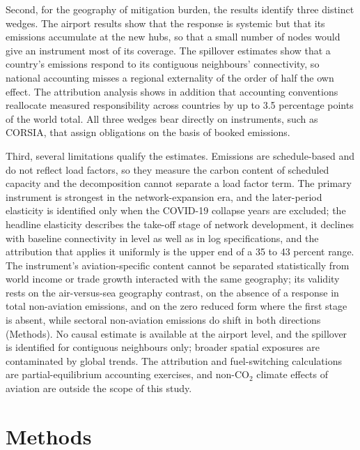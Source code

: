 \documentclass[12pt]{article}
\begin{document}
Second, for the geography of mitigation burden, the results identify three
distinct wedges. The airport results show that the response is systemic
but that its emissions accumulate at the new hubs, so that a small number
of nodes would give an instrument most of its coverage. The spillover
estimates show that a country's emissions respond to its contiguous
neighbours' connectivity, so national accounting misses a regional
externality of the order of half the own effect. The attribution analysis
shows in addition that accounting conventions reallocate measured
responsibility across countries by up to 3.5 percentage points of the
world total. All three wedges bear directly on instruments, such as
CORSIA, that assign obligations on the basis of booked emissions.

Third, several limitations qualify the estimates. Emissions are
schedule-based and do not reflect load factors, so they measure the carbon
content of scheduled capacity and the decomposition cannot separate a load
factor term. The primary instrument is strongest in the network-expansion
era, and the later-period elasticity is identified only when the COVID-19
collapse years are excluded; the headline elasticity describes the
take-off stage of network development, it declines with baseline
connectivity in level as well as in log specifications, and the
attribution that applies it uniformly is the upper end of a 35 to 43
percent range. The instrument's aviation-specific content
cannot be separated statistically from world income or trade growth
interacted with the same geography; its validity rests on the air-versus-sea
geography contrast, on the absence of a response in total non-aviation
emissions, and on the zero reduced form where the first stage is absent,
while sectoral non-aviation emissions do shift in both directions
(Methods). No causal estimate is available at the airport level, and the
spillover is identified for contiguous neighbours only; broader spatial
exposures are contaminated by global trends. The attribution and
fuel-switching calculations are partial-equilibrium accounting exercises,
and non-CO$_2$ climate effects of aviation are outside the scope of this
study.

\section*{Methods}
\end{document}
